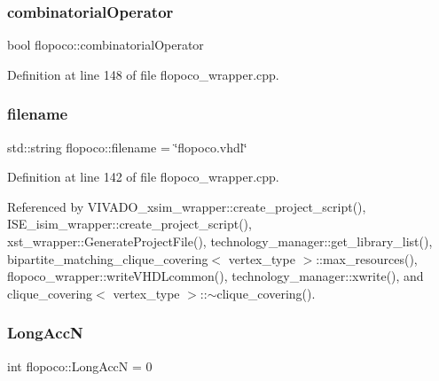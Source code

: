 \mbox{\label{namespaceflopoco_abc755afc329d2566c53663b02f29391b}} 
\subsubsection{\texorpdfstring{combinatorial\+Operator}{combinatorialOperator}}
{\footnotesize\ttfamily bool flopoco\+::combinatorial\+Operator}



Definition at line 148 of file flopoco\+\_\+wrapper.\+cpp.

\mbox{\label{namespaceflopoco_a5c4225423306558917cdb1506c97276c}} 
\subsubsection{\texorpdfstring{filename}{filename}}
{\footnotesize\ttfamily std\+::string flopoco\+::filename = \char`\"{}flopoco.\+vhdl\char`\"{}}



Definition at line 142 of file flopoco\+\_\+wrapper.\+cpp.



Referenced by V\+I\+V\+A\+D\+O\+\_\+xsim\+\_\+wrapper\+::create\+\_\+project\+\_\+script(), I\+S\+E\+\_\+isim\+\_\+wrapper\+::create\+\_\+project\+\_\+script(), xst\+\_\+wrapper\+::\+Generate\+Project\+File(), technology\+\_\+manager\+::get\+\_\+library\+\_\+list(), bipartite\+\_\+matching\+\_\+clique\+\_\+covering$<$ vertex\+\_\+type $>$\+::max\+\_\+resources(), flopoco\+\_\+wrapper\+::write\+V\+H\+D\+Lcommon(), technology\+\_\+manager\+::xwrite(), and clique\+\_\+covering$<$ vertex\+\_\+type $>$\+::$\sim$clique\+\_\+covering().

\mbox{\label{namespaceflopoco_a6873f9454d8fc367f2e8c34d37b2b9fe}} 
\subsubsection{\texorpdfstring{Long\+AccN}{LongAccN}}
{\footnotesize\ttfamily int flopoco\+::\+Long\+AccN = 0}



